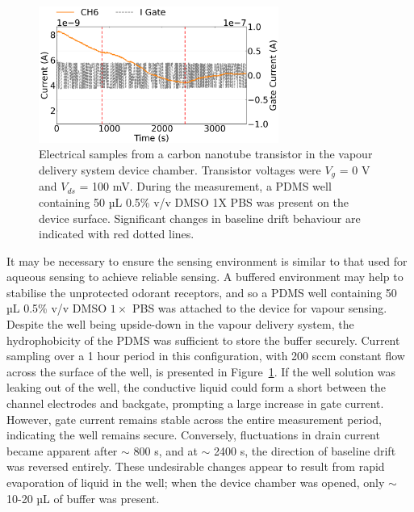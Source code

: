 \documentclass[
  a4paper,
]{scrbook}
\begin{document}
\begin{figure}

{\centering \includegraphics[width=0.7\textwidth,height=\textheight]{figures/ch8/Q39C11.png}

}

\caption{\label{fig-buffer-vapour}Electrical samples from a carbon
nanotube transistor in the vapour delivery system device chamber.
Transistor voltages were \(V_{g}\) = 0 V and \(V_{ds}\) = 100 mV. During
the measurement, a PDMS well containing 50 µL 0.5\% v/v DMSO 1X PBS was
present on the device surface. Significant changes in baseline drift
behaviour are indicated with red dotted lines.}

\end{figure}

It may be necessary to ensure the sensing environment is similar to that
used for aqueous sensing to achieve reliable sensing. A buffered
environment may help to stabilise the unprotected odorant receptors, and
so a PDMS well containing 50 µL 0.5\% v/v DMSO \(1 \times\) PBS was
attached to the device for vapour sensing. Despite the well being
upside-down in the vapour delivery system, the hydrophobicity of the
PDMS was sufficient to store the buffer securely. Current sampling over
a 1 hour period in this configuration, with 200 sccm constant flow
across the surface of the well, is presented in
Figure~\ref{fig-buffer-vapour}. If the well solution was leaking out of
the well, the conductive liquid could form a short between the channel
electrodes and backgate, prompting a large increase in gate current.
However, gate current remains stable across the entire measurement
period, indicating the well remains secure. Conversely, fluctuations in
drain current became apparent after \(\sim\) 800 s, and at \(\sim\) 2400
s, the direction of baseline drift was reversed entirely. These
undesirable changes appear to result from rapid evaporation of liquid in
the well; when the device chamber was opened, only \(\sim\) 10-20 µL of
buffer was present.
\end{document}
